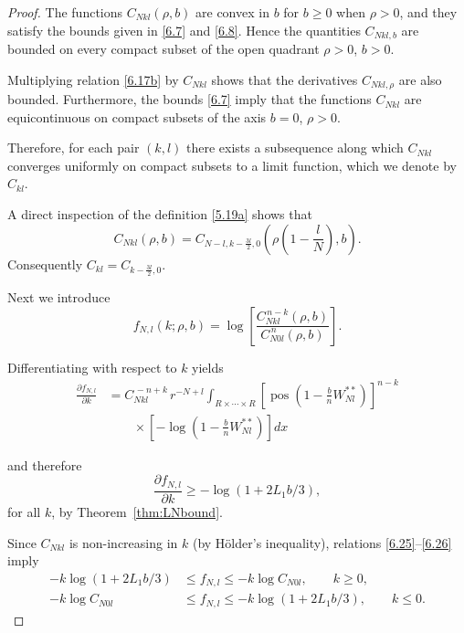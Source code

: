 \documentclass[11pt]{article}
\begin{document}
\begin{proof}
The functions $C_{Nkl}(\rho,b)$ are convex in $b$ for $b\ge0$ when $\rho>0$,
and they satisfy the bounds given in \eqref{6.7} and \eqref{6.8}. 
Hence the quantities $C_{Nkl,b}$ are bounded on every compact subset of the
open quadrant $\rho>0$, $b>0$.

Multiplying relation \eqref{6.17b} by $C_{Nkl}$ shows that the derivatives
$C_{Nkl,\rho}$ are also bounded. 
Furthermore, the bounds \eqref{6.7} imply that the functions $C_{Nkl}$ are
equicontinuous on compact subsets of the axis $b=0$, $\rho>0$.

Therefore, for each pair $(k,l)$ there exists a subsequence along which
$C_{Nkl}$ converges uniformly on compact subsets to a limit function,
which we denote by $C_{kl}$.

A direct inspection of the definition \eqref{5.19a} shows that
\begin{equation}
C_{Nkl}(\rho,b)
=
C_{N-l,k-\frac{3l}{2},0}\!\left(\rho\!\left(1-\frac{l}{N}\right),b\right).
\tag{6.24}\label{6.24}
\end{equation}
Consequently $C_{kl}=C_{k-\frac{3l}{2},0}.$

Next we introduce
\begin{equation}
f_{N,l}(k;\rho,b)
=
\log
\left[
\frac{C_{Nkl}^{\,n-k}(\rho,b)}{C_{N0l}^{\,n}(\rho,b)}
\right].
\tag{6.25}\label{6.25}
\end{equation}

Differentiating with respect to $k$ yields
\begin{align}
\frac{\partial f_{N,l}}{\partial k}
&=
C_{Nkl}^{\,-n+k}\,
r^{-N+l}
\int_{R\times\cdots\times R}
\left[
\operatorname{pos}
\!\left(
1-\frac{b}{n}W_{Nl}^{**}
\right)
\right]^{n-k}
\nonumber\\
&\qquad\times
\left[
-\log
\!\left(
1-\frac{b}{n}W_{Nl}^{**}
\right)
\right]
dx
\tag{6.26}\label{6.26}
\end{align}

and therefore
\[
\frac{\partial f_{N,l}}{\partial k}
\ge
-\log(1+2L_1b/3),
\]
for all $k$, by Theorem~\ref{thm:LNbound}.

Since $C_{Nkl}$ is non-increasing in $k$ (by Hölder's inequality), 
relations \eqref{6.25}–\eqref{6.26} imply
\begin{align*}
-k\log(1+2L_1b/3)
&\le
f_{N,l}
\le
-k\log C_{N0l},
\qquad k\ge0,
\\
-k\log C_{N0l}
&\le
f_{N,l}
\le
-k\log(1+2L_1b/3),
\qquad k\le0.
\tag{6.27}\label{6.27}
\end{align*}


\end{proof}
\end{document}
